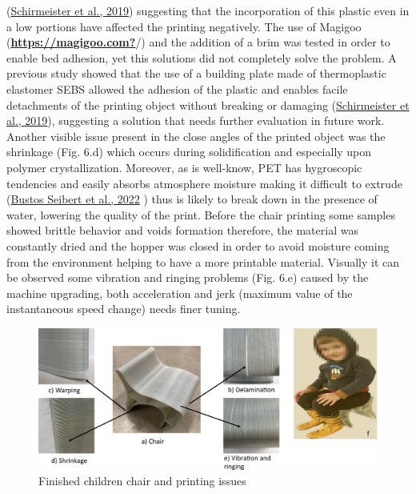 \documentclass[
  12pt,
  number,
  review]{elsarticle}
\begin{document}
(\protect\hyperlink{ref-schirmeister2019}{Schirmeister et al., 2019})
suggesting that the incorporation of this plastic even in a low portions
have affected the printing negatively. The use of Magigoo
(\protect\hyperlink{ref-https:ux2fux2fmagigoo.com}{\textbf{https://magigoo.com?}}/)
and the addition of a brim was tested in order to enable bed adhesion,
yet this solutions did not completely solve the problem. A previous
study showed that the use of a building plate made of thermoplastic
elastomer SEBS allowed the adhesion of the plastic and enables facile
detachments of the printing object without breaking or damaging
(\protect\hyperlink{ref-schirmeister2019}{Schirmeister et al., 2019}),
suggesting a solution that needs further evaluation in future work.
Another visible issue present in the close angles of the printed object
was the shrinkage (Fig. 6.d) which occurs during solidification and
especially upon polymer crystallization. Moreover, as is well-know, PET
has hygroscopic tendencies and easily absorbs atmosphere moisture making
it difficult to extrude
(\protect\hyperlink{ref-bustosseibert2022}{Bustos Seibert et al., 2022}
) thus is likely to break down in the presence of water, lowering the
quality of the print. Before the chair printing some samples showed
brittle behavior and voids formation therefore, the material was
constantly dried and the hopper was closed in order to avoid moisture
coming from the environment helping to have a more printable material.
Visually it can be observed some vibration and ringing problems (Fig.
6.e) caused by the machine upgrading, both acceleration and jerk
(maximum value of the instantaneous speed change) needs finer tuning.

\begin{figure}

{\centering \includegraphics{figures/Figure6.png}

}

\caption{Finished children chair and printing issues}

\end{figure}
\end{document}
